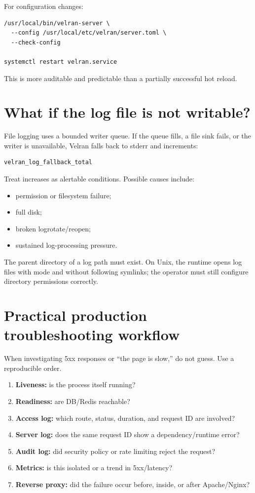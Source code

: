 For configuration changes:

\begin{lstlisting}
/usr/local/bin/velran-server \
  --config /usr/local/etc/velran/server.toml \
  --check-config

systemctl restart velran.service
\end{lstlisting}

This is more auditable and predictable than a partially successful hot reload.

\section{What if the log file is not writable?}

File logging uses a bounded writer queue. If the queue fills, a file sink fails, or the writer is unavailable, Velran falls back to stderr and increments:

\begin{lstlisting}
velran_log_fallback_total
\end{lstlisting}

Treat increases as alertable conditions. Possible causes include:

\begin{itemize}
  \item permission or filesystem failure;
  \item full disk;
  \item broken logrotate/reopen;
  \item sustained log-processing pressure.
\end{itemize}

The parent directory of a log path must exist. On Unix, the runtime opens log files with mode  and without following symlinks; the operator must still configure directory permissions correctly.

\section{Practical production troubleshooting workflow}

When investigating 5xx responses or ``the page is slow,'' do not guess. Use a reproducible order.

\begin{enumerate}
  \item \textbf{Liveness:} is the process itself running?
  \item \textbf{Readiness:} are DB/Redis reachable?
  \item \textbf{Access log:} which route, status, duration, and request ID are involved?
  \item \textbf{Server log:} does the same request ID show a dependency/runtime error?
  \item \textbf{Audit log:} did security policy or rate limiting reject the request?
  \item \textbf{Metrics:} is this isolated or a trend in 5xx/latency?
  \item \textbf{Reverse proxy:} did the failure occur before, inside, or after Apache/Nginx?
\end{enumerate}

